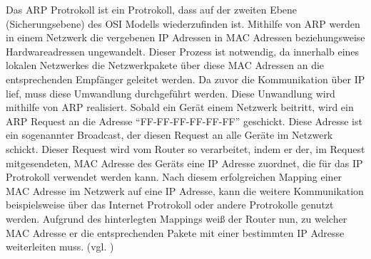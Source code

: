 Das \ac{ARP} Protrokoll ist ein Protrokoll, dass auf der zweiten Ebene (Sicherungsebene) des OSI Modells wiederzufinden ist. Mithilfe von \ac{ARP} werden in einem Netzwerk die vergebenen \ac{IP} Adressen in MAC Adressen beziehungsweise Hardwareadressen ungewandelt. Dieser Prozess ist notwendig, da innerhalb eines lokalen Netzwerkes die Netzwerkpakete über diese MAC Adressen an die entsprechenden Empfänger geleitet werden. Da zuvor die Kommunikation über \ac{IP} lief, muss diese Umwandlung durchgeführt werden. 
Diese Unwandlung wird mithilfe von \ac{ARP} realisiert. Sobald ein Gerät einem Netzwerk beitritt, wird ein \ac{ARP} Request an die Adresse ``FF-FF-FF-FF-FF-FF'' geschickt. Diese Adresse ist ein sogenannter Broadcast, der diesen Request an alle Geräte im Netzwerk schickt. Dieser Request wird vom Router so verarbeitet, indem er der, im Request mitgesendeten, MAC Adresse des Geräts eine \ac{IP} Adresse zuordnet, die für das IP Protrokoll verwendet werden kann. Nach diesem erfolgreichen Mapping einer \ac{MAC} Adresse im Netzwerk auf eine \ac{IP} Adresse, kann die weitere Kommunikation beispielsweise über das Internet Protrokoll oder andere Protrokolle genutzt werden. Aufgrund des hinterlegten Mappings weiß der Router nun, zu welcher \ac{MAC} Adresse er die entsprechenden Pakete mit einer bestimmten \ac{IP} Adresse weiterleiten muss. (vgl. \cite{.r}\cite{.q})